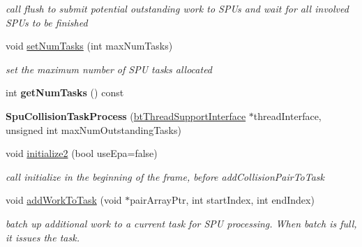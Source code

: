 \begin{DoxyCompactItemize}
\begin{DoxyCompactList}\small\item\em call flush to submit potential outstanding work to S\+P\+Us and wait for all involved S\+P\+Us to be finished \end{DoxyCompactList}\item 
void \hyperlink{classSpuCollisionTaskProcess_aa079f41eb800756bff561982db6dab00}{set\+Num\+Tasks} (int max\+Num\+Tasks)
\begin{DoxyCompactList}\small\item\em set the maximum number of S\+PU tasks allocated \end{DoxyCompactList}\item 
\mbox{\label{classSpuCollisionTaskProcess_abe43a4914aba6cfd93ccaf16e94f31d6}} 
int {\bfseries get\+Num\+Tasks} () const
\item 
\mbox{\label{classSpuCollisionTaskProcess_ae2fd53d16de149643d8f538e183e48eb}} 
{\bfseries Spu\+Collision\+Task\+Process} (\hyperlink{classbtThreadSupportInterface}{bt\+Thread\+Support\+Interface} $\ast$thread\+Interface, unsigned int max\+Num\+Outstanding\+Tasks)
\item 
\mbox{\label{classSpuCollisionTaskProcess_afcdb413769d35c957ddc5c8ec2985588}} 
void \hyperlink{classSpuCollisionTaskProcess_afcdb413769d35c957ddc5c8ec2985588}{initialize2} (bool use\+Epa=false)
\begin{DoxyCompactList}\small\item\em call initialize in the beginning of the frame, before add\+Collision\+Pair\+To\+Task \end{DoxyCompactList}\item 
\mbox{\label{classSpuCollisionTaskProcess_a5a0c4e28e49f0ecfd3aa8255960c77d2}} 
void \hyperlink{classSpuCollisionTaskProcess_a5a0c4e28e49f0ecfd3aa8255960c77d2}{add\+Work\+To\+Task} (void $\ast$pair\+Array\+Ptr, int start\+Index, int end\+Index)
\begin{DoxyCompactList}\small\item\em batch up additional work to a current task for S\+PU processing. When batch is full, it issues the task. \end{DoxyCompactList}\item 
\mbox{\label{classSpuCollisionTaskProcess_afdb2b028ac84b0e90286eb6d4ed10fd3}} 

\end{DoxyCompactItemize}
